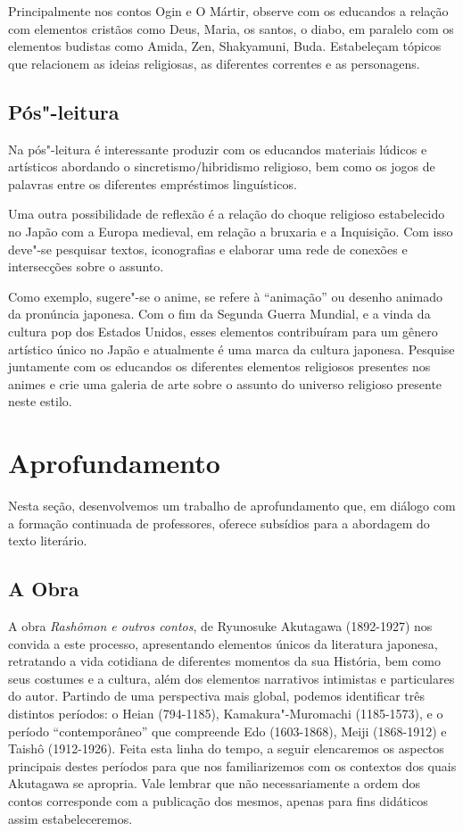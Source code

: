 \documentclass[12pt]{extarticle}
\begin{document}
Principalmente nos contos Ogin e O Mártir, observe com os educandos a relação
com elementos cristãos como Deus, Maria, os santos, o diabo, em paralelo com os
elementos budistas como Amida, Zen, Shakyamuni, Buda.  Estabeleçam tópicos que
relacionem as ideias religiosas, as diferentes correntes e as personagens.


\subsection{Pós"-leitura}

Na pós"-leitura é interessante produzir com os educandos materiais lúdicos e
artísticos abordando o sincretismo/hibridismo religioso, bem como os jogos de
palavras entre os diferentes empréstimos linguísticos.

Uma outra possibilidade de reflexão é a relação do choque religioso
estabelecido no Japão com a Europa medieval, em relação a bruxaria e a
Inquisição. Com isso deve"-se pesquisar textos, iconografias e elaborar uma
rede de conexões e intersecções sobre o assunto.

Como exemplo, sugere"-se o anime, se refere à ``animação'' ou desenho animado
da pronúncia japonesa. Com o fim da Segunda Guerra Mundial, e a vinda da
cultura pop dos Estados Unidos, esses elementos contribuíram para um gênero
artístico único no Japão e atualmente é uma marca da cultura japonesa. Pesquise
juntamente com os educandos os diferentes elementos religiosos presentes nos
animes e crie uma galeria de arte sobre o assunto do universo religioso
presente neste estilo.


\section{Aprofundamento}


Nesta seção, desenvolvemos um trabalho de aprofundamento que, em diálogo com a
formação continuada de professores, oferece subsídios para a abordagem do texto
literário.

\subsection{A Obra}

A obra \emph{Rashômon e outros contos}, de Ryunosuke Akutagawa (1892-1927) nos
convida a este processo, apresentando elementos únicos da literatura japonesa,
retratando a vida cotidiana de diferentes momentos da sua História, bem como
seus costumes e a cultura, além dos elementos narrativos intimistas e
particulares do autor. Partindo de uma perspectiva mais global, podemos
identificar três distintos períodos: o Heian (794-1185), Kamakura"-Muromachi
(1185-1573), e o período ``contemporâneo'' que compreende Edo (1603-1868),
Meiji (1868-1912) e Taishô (1912-1926). Feita esta linha do tempo, a seguir
elencaremos os aspectos principais destes períodos para que nos familiarizemos
com os contextos dos quais Akutagawa se apropria. Vale lembrar que não
necessariamente a ordem dos contos corresponde com a publicação dos mesmos,
apenas para fins didáticos assim estabeleceremos.
\end{document}
